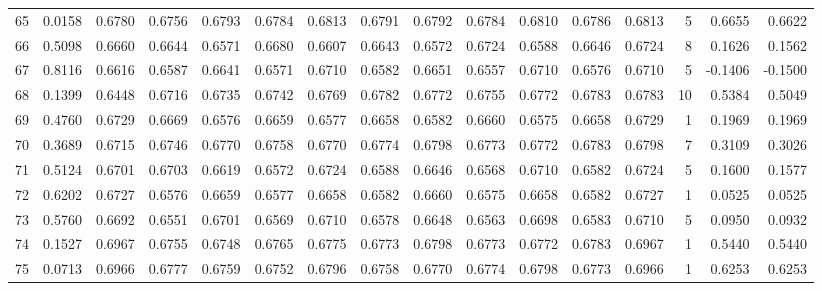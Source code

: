 \begin{tabular}{lrrrrrrrrrrrrrrr}
65  &      0.0158 &  0.6780 &  0.6756 &  0.6793 &  0.6784 &  0.6813 &  0.6791 &  0.6792 &  0.6784 &  0.6810 &   0.6786 &     0.6813 &      5 &                    0.6655 &                     0.6622 \\
66  &      0.5098 &  0.6660 &  0.6644 &  0.6571 &  0.6680 &  0.6607 &  0.6643 &  0.6572 &  0.6724 &  0.6588 &   0.6646 &     0.6724 &      8 &                    0.1626 &                     0.1562 \\
67  &      0.8116 &  0.6616 &  0.6587 &  0.6641 &  0.6571 &  0.6710 &  0.6582 &  0.6651 &  0.6557 &  0.6710 &   0.6576 &     0.6710 &      5 &                   -0.1406 &                    -0.1500 \\
68  &      0.1399 &  0.6448 &  0.6716 &  0.6735 &  0.6742 &  0.6769 &  0.6782 &  0.6772 &  0.6755 &  0.6772 &   0.6783 &     0.6783 &     10 &                    0.5384 &                     0.5049 \\
69  &      0.4760 &  0.6729 &  0.6669 &  0.6576 &  0.6659 &  0.6577 &  0.6658 &  0.6582 &  0.6660 &  0.6575 &   0.6658 &     0.6729 &      1 &                    0.1969 &                     0.1969 \\
70  &      0.3689 &  0.6715 &  0.6746 &  0.6770 &  0.6758 &  0.6770 &  0.6774 &  0.6798 &  0.6773 &  0.6772 &   0.6783 &     0.6798 &      7 &                    0.3109 &                     0.3026 \\
71  &      0.5124 &  0.6701 &  0.6703 &  0.6619 &  0.6572 &  0.6724 &  0.6588 &  0.6646 &  0.6568 &  0.6710 &   0.6582 &     0.6724 &      5 &                    0.1600 &                     0.1577 \\
72  &      0.6202 &  0.6727 &  0.6576 &  0.6659 &  0.6577 &  0.6658 &  0.6582 &  0.6660 &  0.6575 &  0.6658 &   0.6582 &     0.6727 &      1 &                    0.0525 &                     0.0525 \\
73  &      0.5760 &  0.6692 &  0.6551 &  0.6701 &  0.6569 &  0.6710 &  0.6578 &  0.6648 &  0.6563 &  0.6698 &   0.6583 &     0.6710 &      5 &                    0.0950 &                     0.0932 \\
74  &      0.1527 &  0.6967 &  0.6755 &  0.6748 &  0.6765 &  0.6775 &  0.6773 &  0.6798 &  0.6773 &  0.6772 &   0.6783 &     0.6967 &      1 &                    0.5440 &                     0.5440 \\
75  &      0.0713 &  0.6966 &  0.6777 &  0.6759 &  0.6752 &  0.6796 &  0.6758 &  0.6770 &  0.6774 &  0.6798 &   0.6773 &     0.6966 &      1 &                    0.6253 &                     0.6253 \\

\end{tabular}
